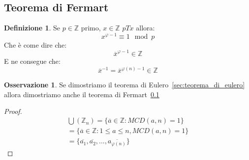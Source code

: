 \documentclass{article}
\theoremstyle{definition}
\newtheorem{definition}{Definizione}[section]
\newtheorem{oss}{Osservazione}[section]
\begin{document}
\subsection{Teorema di Fermart}\label{sec:teorema_di_fermart}
\begin{definition}
        Se $p \in \mathbb{Z}$ primo, $ x \in \mathbb{Z} $ $ p T x  $ allora:
        \begin{equation*}
                x^{\varphi-1} \equiv 1 \mod p
        \end{equation*}
        Che è come dire che:
        \begin{equation*}
                \overline{x}^{\varphi - 1} \in \mathbb{Z}
        \end{equation*}
        E ne consegue che:
        \begin{equation*}
                \overline{x}^{-1} = \overline{x}^{\varphi(n) - 1} \in \mathbb{Z}
        \end{equation*}
\end{definition}

\begin{tcolorbox}
\begin{oss}
        Se dimostriamo il teorema di Eulero~\ref{sec:teorema_di_eulero} allora dimostriamo anche il teorema di Fermart~\ref{sec:teorema_di_fermart}
\end{oss}
\end{tcolorbox}

\begin{tcolorbox}
\begin{proof}
        \begin{align*}
                \bigcup(\mathbb{Z}_n) = \{\overline{a} \in \mathbb{Z} : MCD(a,n) = 1\} \\
                = \{\overline{a} \in \mathbb{Z} : 1 \le a \le n, MCD(a,n) = 1\} \\
                = \{\overline{a_1}, \overline{a_2},\ldots,\overline{a_{\varphi(n)}}\}
        \end{align*} 
\end{proof}
\end{tcolorbox}
\end{document}
